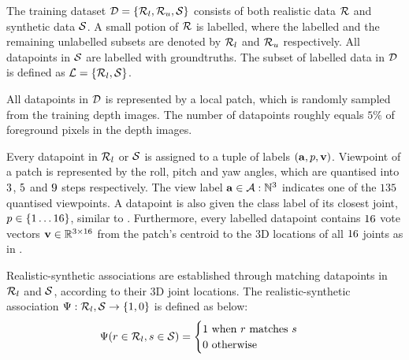 The training dataset $\mathcal{D} = \{\mathcal{R}_{l}, \mathcal{R}_{u}, \mathcal{S}\}$ consists of both realistic data $\mathcal{R}$ and synthetic data $\mathcal{S}$. 
A small potion of $\mathcal{R}$ is labelled, where the labelled and the remaining unlabelled subsets are denoted by $\mathcal{R}_{l}$ and $\mathcal{R}_{u}$ respectively. All datapoints in $\mathcal{S}$ are labelled with groundtruths. The subset of labelled data in $\mathcal{D}$ is defined as $\mathcal{L} = \{\mathcal{R}_{l}, \mathcal{S}\}$.  

All datapoints in $\mathcal{D}$ is represented by a local patch, which is randomly sampled from the training depth images. The number of datapoints roughly equals $5\%$ of foreground pixels in the depth images. 

Every datapoint in $\mathcal{R}_{l}$ or $\mathcal{S}$ is assigned to a tuple of labels $( \mathbf{a}, p, \mathbf{v})$. Viewpoint of a patch is represented by the roll, pitch and yaw angles, which are quantised into $3$, $5$ and $9$ steps respectively. The view label $\mathbf{a} \in \mathcal{A}:\mathbb{N}^{3}$ indicates one of the $135$ quantised viewpoints. A datapoint is also given the class label of its closest joint, $p \in \{1\dots16\}$, similar to \cite{Shotton2011}.   
Furthermore, every labelled datapoint contains $16$ vote vectors $\mathbf{v} \in \mathbb{R}^{3\times16}$ from the patch's centroid to the 3D locations of all $16$ joints as in \cite{Gall2011}. 

Realistic-synthetic associations are established through matching datapoints in $\mathcal{R}_{l}$ and $\mathcal{S}$, according to their 3D joint locations.  The realistic-synthetic association $\mathrm{\Psi}: \mathcal{R}_{l},\mathcal{S} \rightarrow \{1,0\}$ is defined as below:
\begin{equation}
	\mathrm{\Psi}(r \in \mathcal{R}_{l}, s \in \mathcal{S}) =
		\begin{cases}
			1 \mbox{ when $r$ matches $s$} \\
			0 \mbox{ otherwise}
		\end{cases}
	\label{eq:association}
\end{equation}


